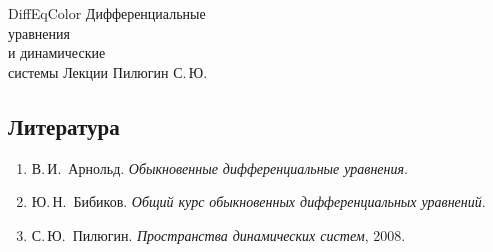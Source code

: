 \documentclass[12pt,a4paper]{article}
\begin{document}
	
	\makecover
	{DiffEqColor}
	{Дифференциальные \\ уравнения \\ и динамические \\ системы}
	{Лекции}
	{Пилюгин С.\,Ю.}
	
	\makestaffandcontents
	
	\newpage

	\subsection*{Литература}

	\begin{enumerate}
		\item В.\,И.~Арнольд. \emph{Обыкновенные дифференциальные уравнения}.
		\item Ю.\,Н.~Бибиков. \emph{Общий курс обыкновенных дифференциальных уравнений}.
		\item С.\,Ю.~Пилюгин. \emph{Пространства динамических систем}, 2008.
	\end{enumerate}	

\end{document}
